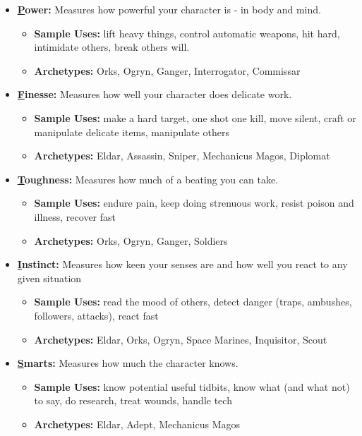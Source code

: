 \begin{itemize}
	\item {\large\textbf{\underline{P}ower:}} Measures how powerful your character is - in body and mind.
	\begin{itemize}
		\item \textbf{Sample Uses:} lift heavy things, control automatic weapons, hit hard, intimidate others, break others will.
		\item \textbf{Archetypes:} Orks, Ogryn, Ganger, Interrogator, Commissar
	\end{itemize}

	\item {\large\textbf{\underline{F}inesse:}} Measures how well your character does delicate work.
	\begin{itemize}
		\item \textbf{Sample Uses:} make a hard target, one shot one kill, move silent, craft or manipulate delicate items, manipulate others
		\item \textbf{Archetypes:} Eldar, Assassin, Sniper, Mechanicus Magos, Diplomat
	\end{itemize}

	\item {\large\textbf{\underline{T}oughness:}} Measures how much of a beating you can take.
	\begin{itemize}
		\item \textbf{Sample Uses:} endure pain, keep doing strenuous work, resist poison and illness, recover fast
		\item \textbf{Archetypes:} Orks, Ogryn, Ganger, Soldiers
	\end{itemize}

	\item {\large\textbf{\underline{I}nstinct:}} Measures how keen your senses are and how well you react to any given situation
	\begin{itemize}
		\item \textbf{Sample Uses:} read the mood of others, detect danger (traps, ambushes, followers, attacks), react fast
		\item \textbf{Archetypes:} Eldar, Orks, Ogryn, Space Marines, Inquisitor, Scout
	\end{itemize}

	\item {\large\textbf{\underline{S}marts:}} Measures how much the character knows.
	\begin{itemize}
		\item \textbf{Sample Uses:} know potential useful tidbits, know what (and what not) to say, do research, treat wounds, handle tech
		\item \textbf{Archetypes:} Eldar, Adept, Mechanicus Magos
	\end{itemize}


\end{itemize}
